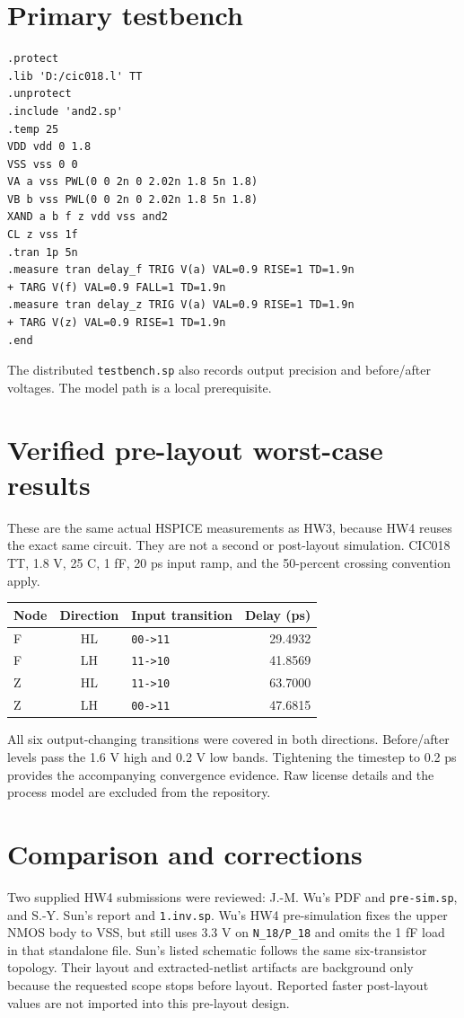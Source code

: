 \documentclass[11pt]{article}
\begin{document}
\section*{Primary testbench}
\begin{lstlisting}
.protect
.lib 'D:/cic018.l' TT
.unprotect
.include 'and2.sp'
.temp 25
VDD vdd 0 1.8
VSS vss 0 0
VA a vss PWL(0 0 2n 0 2.02n 1.8 5n 1.8)
VB b vss PWL(0 0 2n 0 2.02n 1.8 5n 1.8)
XAND a b f z vdd vss and2
CL z vss 1f
.tran 1p 5n
.measure tran delay_f TRIG V(a) VAL=0.9 RISE=1 TD=1.9n
+ TARG V(f) VAL=0.9 FALL=1 TD=1.9n
.measure tran delay_z TRIG V(a) VAL=0.9 RISE=1 TD=1.9n
+ TARG V(z) VAL=0.9 RISE=1 TD=1.9n
.end
\end{lstlisting}
The distributed \texttt{testbench.sp} also records output precision and before/after voltages. The model path is a local prerequisite.
\newpage\section*{Verified pre-layout worst-case results}
These are the same actual HSPICE measurements as HW3, because HW4 reuses the exact same circuit. They are not a second or post-layout simulation. CIC018 TT, 1.8 V, 25 C, 1 fF, 20 ps input ramp, and the 50-percent crossing convention apply.
\begin{center}\begin{tabular}{lclr}\toprule Node&Direction&Input transition&Delay (ps)\\\midrule
F&HL&\texttt{00->11}&29.4932\\
F&LH&\texttt{11->10}&41.8569\\
Z&HL&\texttt{11->10}&63.7000\\
Z&LH&\texttt{00->11}&47.6815\\
\bottomrule\end{tabular}\end{center}
All six output-changing transitions were covered in both directions. Before/after levels pass the 1.6 V high and 0.2 V low bands. Tightening the timestep to 0.2 ps provides the accompanying convergence evidence. Raw license details and the process model are excluded from the repository.
\section*{Comparison and corrections}
Two supplied HW4 submissions were reviewed: J.-M. Wu's PDF and \texttt{pre-sim.sp}, and S.-Y. Sun's report and \texttt{1.inv.sp}. Wu's HW4 pre-simulation fixes the upper NMOS body to VSS, but still uses 3.3 V on \texttt{N\_18/P\_18} and omits the 1 fF load in that standalone file. Sun's listed schematic follows the same six-transistor topology. Their layout and extracted-netlist artifacts are background only because the requested scope stops before layout. Reported faster post-layout values are not imported into this pre-layout design.
\end{document}
